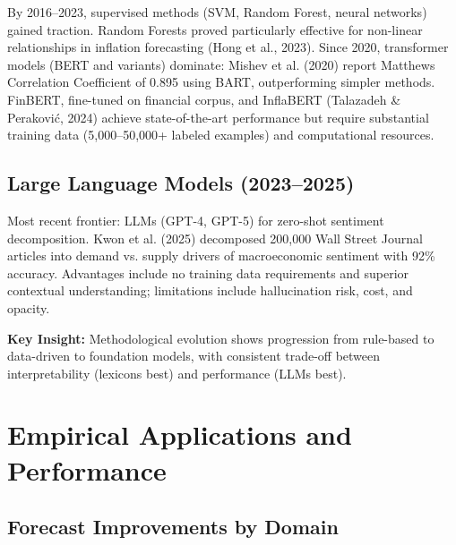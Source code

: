 \documentclass[11pt]{article}
\begin{document}
By 2016--2023, supervised methods (SVM, Random Forest, neural networks) gained traction. Random Forests proved particularly effective for non-linear relationships in inflation forecasting (Hong et al., 2023). Since 2020, transformer models (BERT and variants) dominate: Mishev et al. (2020) report Matthews Correlation Coefficient of 0.895 using BART, outperforming simpler methods. FinBERT, fine-tuned on financial corpus, and InflaBERT (Talazadeh \& Peraković, 2024) achieve state-of-the-art performance but require substantial training data (5,000--50,000+ labeled examples) and computational resources.

\subsection{Large Language Models (2023--2025)}

Most recent frontier: LLMs (GPT-4, GPT-5) for zero-shot sentiment decomposition. Kwon et al. (2025) decomposed 200,000 Wall Street Journal articles into demand vs. supply drivers of macroeconomic sentiment with 92\% accuracy. Advantages include no training data requirements and superior contextual understanding; limitations include hallucination risk, cost, and opacity.

\textbf{Key Insight:} Methodological evolution shows progression from rule-based to data-driven to foundation models, with consistent trade-off between interpretability (lexicons best) and performance (LLMs best).

\section{Empirical Applications and Performance}

\subsection{Forecast Improvements by Domain}
\end{document}
